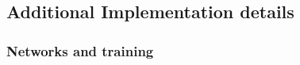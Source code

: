 \documentclass[lettersize,journal]{IEEEtran}
\begin{document}









%


\appendices



\subsection{Additional Implementation details}
\label{si:implementation}
\subsubsection{Networks and training}
\end{document}

